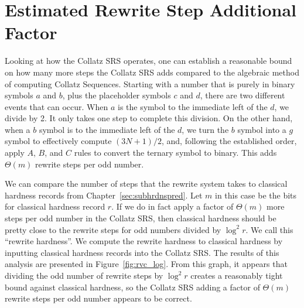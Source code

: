 \section{Estimated Rewrite Step Additional Factor} \label{subsec:estrwsteps}
Looking at how the Collatz SRS operates, one can establish a reasonable bound on how many more steps the Collatz SRS adds compared to the algebraic method of computing Collatz Sequences. Starting with a number that is purely in binary symbols $a$ and $b$, plus the placeholder symbols $c$ and $d$, there are two different events that can occur. When $a$ is the symbol to the immediate left of the $d$, we divide by 2. It only takes one step to complete this division. On the other hand, when a $b$ symbol is to the immediate left of the $d$, we turn the $b$ symbol into a $g$ symbol to effectively compute $(3N+1)/2$, and, following the established order, apply $A$, $B$, and $C$ rules to convert the ternary symbol to binary. This adds $\Theta(m)$ rewrite steps per odd number. \par
We can compare the number of steps that the rewrite system takes to classical hardness records from Chapter~\ref{sec:subhrdnspred}. Let $m$ in this case be the bits for classical hardness record $r$. If we do in fact apply a factor of $\Theta(m)$ more steps per odd number in the Collatz SRS, then classical hardness should be pretty close to the rewrite steps for odd numbers divided by $\log^2{r}$. We call this ``rewrite hardness''. We compute the rewrite hardness to classical hardness by inputting classical hardness records into the Collatz SRS. The results of this analysis are presented in Figure~\ref{fig:rvc_log}. From this graph, it appears that dividing the odd number of rewrite steps by $\log^2{r}$ creates a reasonably tight bound against classical hardness, so the Collatz SRS adding a factor of $\Theta(m)$ rewrite steps per odd number appears to be correct.
